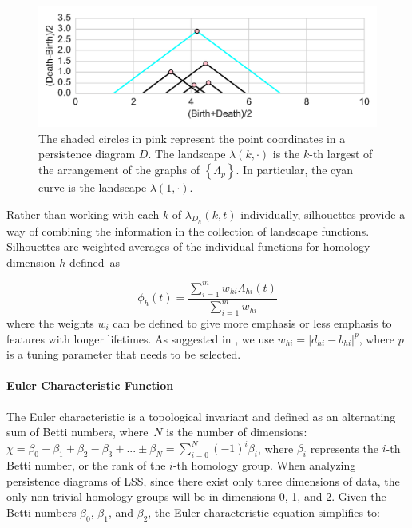 \documentclass[12pt]{article}
\begin{document}
\begin{center}
\begin{figure}[htp!]
  \centering
  \includegraphics[width=0.8\linewidth]{example_landscape.pdf}
    \caption{ The shaded circles in pink represent the point coordinates in a persistence diagram $D$. The landscape $\lambda(k, \cdot)$ is the $k$-th largest of the arrangement of the graphs of $\left \{ \Lambda_{p} \right \}$. In particular, the cyan curve is the landscape $\lambda(1, \cdot)$.}
    \label{fig:landscape}
\end{figure}
\end{center}

Rather than working with each $k$ of $\lambda_{D_h}(k, t)$ individually, silhouettes provide a way of combining the information in the collection of landscape functions.  Silhouettes are weighted averages of the individual functions for homology dimension $h$ defined~as

\begin{equation*}
\phi_h(t) = \frac{\sum_{i = 1}^mw_{hi}\Lambda_{hi}(t)}{\sum_{i = 1}^mw_{hi}}
\end{equation*}
where the weights $w_i$ can be defined to give more emphasis or less emphasis to features with longer lifetimes.  As suggested in \cite{chazal2014stochastic}, we use $w_{hi} = |d_{hi} - b_{hi}|^p$, where $p$ is a tuning parameter that needs to be selected.

\paragraph{Euler Characteristic Function}
The Euler characteristic is a topological invariant and defined as an alternating sum of Betti numbers, where~$N$ is the number of dimensions: $\chi = \beta_{0} - \beta_{1} + \beta_{2} - \beta_{3} + ... \pm \beta_N = \sum_{i=0}^{N} (-1)^{i} \beta_{i}$,
where $\beta_{i}$ represents the $i$-th Betti number, or the rank of the $i$-th homology group. When analyzing persistence diagrams of LSS, since there exist only three dimensions of data, the only non-trivial homology groups will be in dimensions 0, 1, and 2. Given the Betti numbers $\beta_{0}$, $\beta_{1}$, and $\beta_{2}$, the Euler characteristic equation simplifies to:
\end{document}
